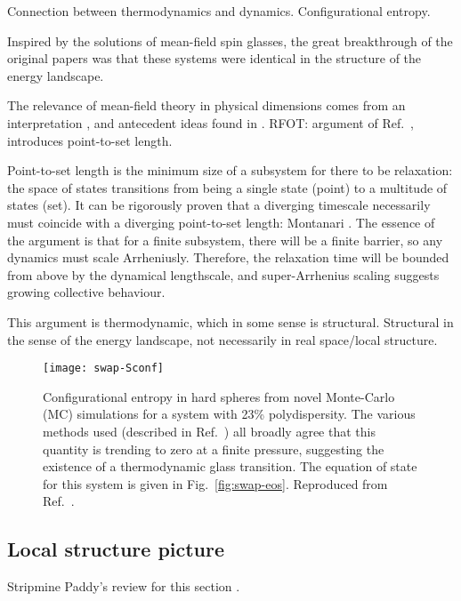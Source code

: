 Connection between thermodynamics and dynamics.
Configurational entropy.

Inspired by the solutions of mean-field spin glasses, the great breakthrough of the original papers was that these systems were identical in the structure of the energy landscape.

The relevance of mean-field theory in physical dimensions comes from an interpretation \cite{KirkpatrickPRB1987, KirkpatrickPRA1989}, and antecedent ideas found in \cite{AdamJCP1965}.
RFOT: argument of Ref.\ \cite{BouchaudJCP2004}, introduces point-to-set length.

Point-to-set length is the minimum size of a subsystem for there to be relaxation: the space of states transitions from being a single state (point) to a multitude of states (set).
It can be rigorously proven that a diverging timescale necessarily must coincide with a diverging point-to-set length: Montanari \cite{MontanariJSP2006}.
The essence of the argument is that for a finite subsystem, there will be a finite barrier, so any dynamics must scale Arrheniusly.
Therefore, the relaxation time will be bounded from above by the dynamical lengthscale, and super-Arrhenius scaling suggests growing collective behaviour.

This argument is thermodynamic, which in some sense is structural.
Structural in the sense of the energy landscape, not necessarily in real space/local structure.

\begin{SCfigure}
  \texttt{[image: swap-Sconf]}
  \caption[Configurational entropy in hard spheres from Monte-Carlo simulations]{
    Configurational entropy in hard spheres from novel Monte-Carlo (MC) simulations for a system with 23\% polydispersity.
    The various methods used (described in Ref.\ \cite{BerthierPNAS2017}) all broadly agree that this quantity is trending to zero at a finite pressure, suggesting the existence of a thermodynamic glass transition.
    The equation of state for this system is given in Fig.\ \ref{fig:swap-eos}.
    Reproduced from Ref.\ \cite{BerthierPNAS2017}.
  }
\end{SCfigure}

\subsection{Local structure picture}

Stripmine Paddy's review for this section \cite{RoyallPR2015}.

